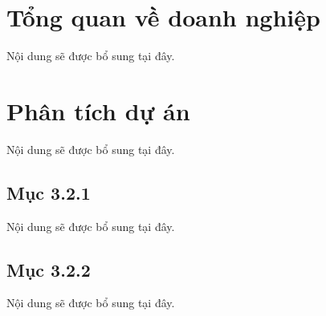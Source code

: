 \section{Tổng quan về doanh nghiệp}
Nội dung sẽ được bổ sung tại đây.

\section{Phân tích dự án}
Nội dung sẽ được bổ sung tại đây.

\subsection{Mục 3.2.1}
Nội dung sẽ được bổ sung tại đây.

\subsection{Mục 3.2.2}
Nội dung sẽ được bổ sung tại đây.
